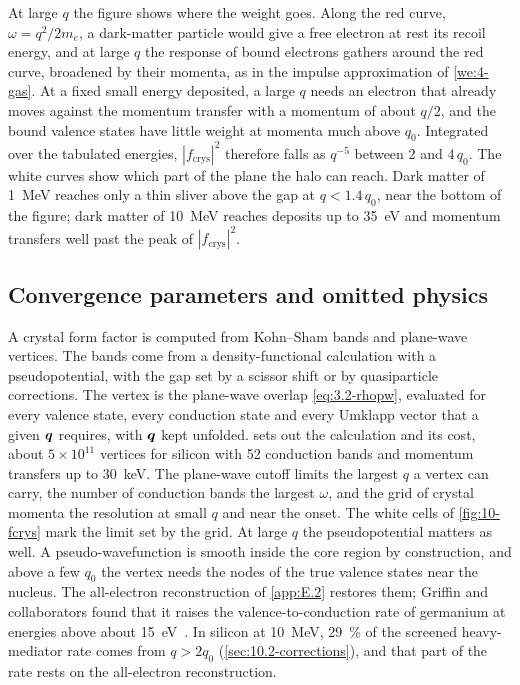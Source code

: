 At large $q$ the figure shows where the weight goes. Along the red curve, $\omega = q^2/2m_e$, a dark-matter particle would give a free electron at rest its recoil energy, and at large $q$ the response of bound electrons gathers around the red curve, broadened by their momenta, as in the impulse approximation of \cref{we:4-gas}. At a fixed small energy deposited, a large $q$ needs an electron that already moves against the momentum transfer with a momentum of about $q/2$, and the bound valence states have little weight at momenta much above $q_0$. Integrated over the tabulated energies, $|f_{\mathrm{crys}}|^2$ therefore falls as $q^{-5}$ between 2 and $4\,q_0$. The white curves show which part of the plane the halo can reach. Dark matter of \SI{1}{MeV} reaches only a thin sliver above the gap at $q < 1.4\,q_0$, near the bottom of the figure; dark matter of \SI{10}{MeV} reaches deposits up to \SI{35}{eV} and momentum transfers well past the peak of $|f_{\mathrm{crys}}|^2$.

\subsection{Convergence parameters and omitted physics}

A crystal form factor is computed from Kohn--Sham bands and plane-wave vertices. The bands come from a density-functional calculation with a pseudopotential, with the gap set by a scissor shift or by quasiparticle corrections. The vertex is the plane-wave overlap \cref{eq:3.2-rhopw}, evaluated for every valence state, every conduction state and every Umklapp vector that a given $\bm{q}$ requires, with $\bm{q}$ kept unfolded.  sets out the calculation and its cost, about $5\times10^{11}$ vertices for silicon with 52 conduction bands and momentum transfers up to \SI{30}{keV}. The plane-wave cutoff limits the largest $q$ a vertex can carry, the number of conduction bands the largest $\omega$, and the grid of crystal momenta the resolution at small $q$ and near the onset. The white cells of \cref{fig:10-fcrys} mark the limit set by the grid. At large $q$ the pseudopotential matters as well. A pseudo-wavefunction is smooth inside the core region by construction, and above a few $q_0$ the vertex needs the nodes of the true valence states near the nucleus. The all-electron reconstruction of \cref{app:E.2} restores them; Griffin and collaborators found that it raises the valence-to-conduction rate of germanium at energies above about \SI{15}{eV}~\cite[Sect.~1]{griffin2021extended}. In silicon at \SI{10}{MeV}, \SI{29}{\percent} of the screened heavy-mediator rate comes from $q > 2q_0$ (\cref{sec:10.2-corrections}), and that part of the rate rests on the all-electron reconstruction.

